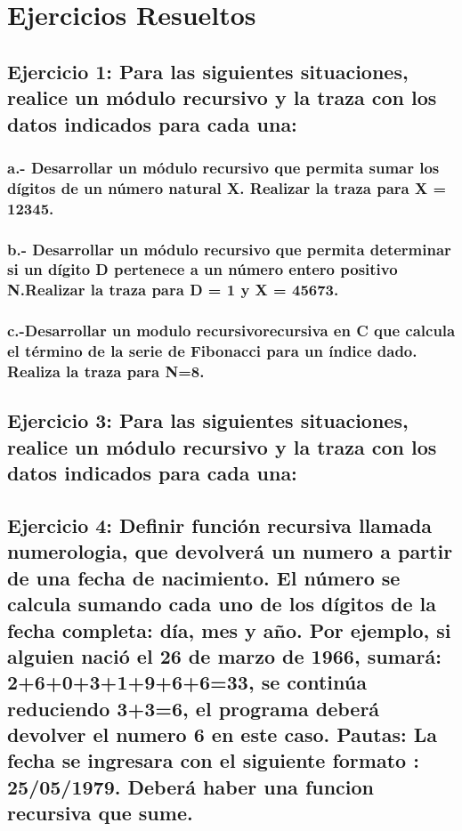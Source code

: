 \documentclass[a4paper]{article}
\begin{document}
\newpage
\section*{Ejercicios Resueltos}
\subsection*{Ejercicio 1: Para las siguientes situaciones, realice un módulo recursivo y la traza con los 	datos indicados para cada una: }
\subsubsection*{a.- Desarrollar un módulo recursivo que permita sumar los dígitos de un número natural X.	Realizar la traza para X = 12345.}

\subsubsection*{b.- Desarrollar un módulo recursivo que permita determinar si un dígito D pertenece a un número entero positivo N.Realizar la traza para D = 1 y X = 45673.}

\subsubsection*{c.-Desarrollar un modulo recursivorecursiva en C que calcula el término de la serie de Fibonacci para un índice dado. Realiza la traza para N=8.}

\subsection*{Ejercicio 3: Para las siguientes situaciones, realice un módulo recursivo y la traza con los 	datos indicados para cada una:}

\subsection*{Ejercicio 4:  Definir función recursiva llamada numerologia, que devolverá un numero a partir de una fecha de nacimiento. El número se calcula sumando cada uno de los dígitos de la fecha completa: día, mes y año. Por ejemplo, si alguien nació el 26 de marzo de 1966, sumará: 2+6+0+3+1+9+6+6=33, se continúa reduciendo 3+3=6, el programa deberá devolver el numero 6 en este caso.	Pautas:	La fecha se ingresara  con el siguiente formato : 25/05/1979.	Deberá haber una funcion recursiva que sume.}

\end{document}
